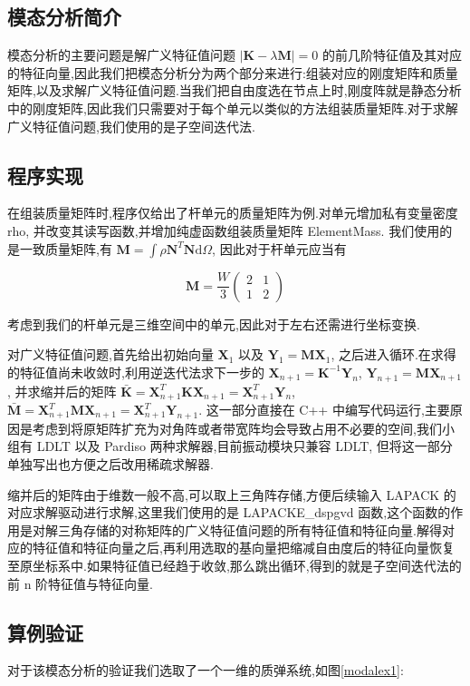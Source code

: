 
\subsection{模态分析简介}
模态分析的主要问题是解广义特征值问题 $|\mathbf{K}-\lambda\mathbf{M}|=0$ 的前几阶特征值及其对应的特征向量,因此我们把模态分析分为两个部分来进行:组装对应的刚度矩阵和质量矩阵,以及求解广义特征值问题.当我们把自由度选在节点上时,刚度阵就是静态分析中的刚度矩阵,因此我们只需要对于每个单元以类似的方法组装质量矩阵.对于求解广义特征值问题,我们使用的是子空间迭代法.
\subsection{程序实现}
在组装质量矩阵时,程序仅给出了杆单元的质量矩阵为例.对单元增加私有变量密度 rho, 并改变其读写函数,并增加纯虚函数组装质量矩阵 ElementMass. 我们使用的是一致质量矩阵,有 $\mathbf{M}=\int\rho\mathbf{N}^T\mathbf{N}\mathrm{d}\Omega$, 因此对于杆单元应当有

\[
\mathbf{M}=\frac{W}{3}\left(\begin{array}{cc} 2&1\\1&2 \end{array} \right)
\]

考虑到我们的杆单元是三维空间中的单元,因此对于左右还需进行坐标变换.

对广义特征值问题,首先给出初始向量 $\mathbf{X}_1$ 以及 $\mathbf{Y}_1=\mathbf{M}\mathbf{X}_1$, 之后进入循环.在求得的特征值尚未收敛时,利用逆迭代法求下一步的 $\mathbf{X}_{n+1}=\mathbf{K}^{-1}\mathbf{Y}_n$, $\mathbf{Y}_{n+1}=\mathbf{M}\mathbf{X}_{n+1}$, 并求缩并后的矩阵 $\bar{\mathbf{K}}=\mathbf{X}_{n+1}^T\mathbf{K}\mathbf{X}_{n+1}=\mathbf{X}_{n+1}^T\mathbf{Y}_n$,  $\bar{\mathbf{M}}=\mathbf{X}_{n+1}^T\mathbf{M}\mathbf{X}_{n+1}=\mathbf{X}_{n+1}^T\mathbf{Y}_{n+1}$. 这一部分直接在 C++ 中编写代码运行,主要原因是考虑到将原矩阵扩充为对角阵或者带宽阵均会导致占用不必要的空间,我们小组有 LDLT 以及 Pardiso 两种求解器,目前振动模块只兼容 LDLT, 但将这一部分单独写出也方便之后改用稀疏求解器.

缩并后的矩阵由于维数一般不高,可以取上三角阵存储,方便后续输入 LAPACK 的对应求解驱动进行求解,这里我们使用的是 LAPACKE\_dspgvd 函数,这个函数的作用是对解三角存储的对称矩阵的广义特征值问题的所有特征值和特征向量.解得对应的特征值和特征向量之后,再利用选取的基向量把缩减自由度后的特征向量恢复至原坐标系中.如果特征值已经趋于收敛,那么跳出循环,得到的就是子空间迭代法的前 n 阶特征值与特征向量.

\subsection{算例验证}
对于该模态分析的验证我们选取了一个一维的质弹系统,如图\ref{modalex1}:

